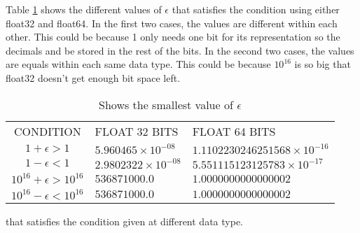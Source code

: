 Table \ref{tab:epsilon} shows the different values of $\epsilon$ that satisfies the condition using either float32 and float64. In the first two cases, the values are different within each other. This could be because 1 only needs one bit for its representation so the decimals and be stored in the rest of the bits. In the second two cases, the values are equals within each same data type. This could be because $10^{16}$ is so big that float32 doesn't get enough bit space left. 

\begin{table}[]
    \centering
    \begin{tabular}{c|l|l}
        CONDITION            & FLOAT 32 BITS            & FLOAT 64 BITS \\
        $1 + \epsilon > 1$  & $5.960465\times 10^{-08}$ & $1.1102230246251568 \times 10^{-16}$\\
        $1 - \epsilon < 1$ & $2.9802322\times 10^{-08}$ & $5.551115123125783 \times 10^{-17}$ \\
        $10^{16} +\epsilon > 10^{16}$ & $536871000.0$ & $1.0000000000000002$ \\
        $10^{16} -\epsilon < 10^{16}$ & $536871000.0$ & $1.0000000000000002$\\
    \end{tabular}
    \caption{Shows the smallest value of $\epsilon$} that satisfies the condition given at different data type.
    \label{tab:epsilon}
\end{table}
